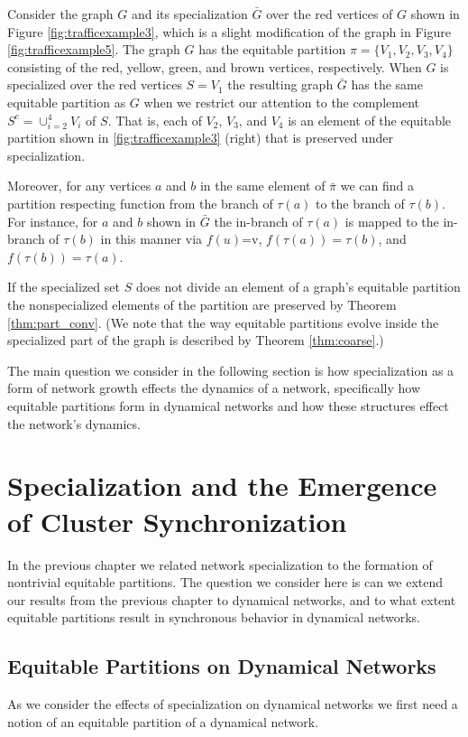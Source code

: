 \documentclass[12pt]{thesis}
\begin{document}
\begin{example}\label{ex:thm2}
Consider the graph $G$ and its specialization $\bar{G}$ over the red vertices of $G$ shown in Figure \ref{fig:trafficexample3}, which is a slight modification of the graph in Figure \ref{fig:trafficexample5}.
The graph $G$ has the equitable partition $\pi=\{V_1,V_2,V_3,V_4\}$ consisting of the red, yellow, green, and brown vertices, respectively.
When $G$ is specialized over the red vertices $S=V_1$ the resulting graph $\bar{G}$ has the same equitable partition as $G$ when we restrict our attention to the complement $S^c=\cup_{i=2}^4 V_i$ of $S$.
That is, each of $V_2$, $V_3$, and $V_4$ is an element of the equitable partition shown in \ref{fig:trafficexample3} (right) that is preserved under specialization.

Moreover, for any vertices $a$ and $b$ in the same element of $\bar{\pi}$ we can find a partition respecting function from the branch of $\tau(a)$ to the branch of $\tau(b)$.
For instance, for $a$ and $b$ shown in $\bar{G}$ the in-branch of $\tau(a)$ is mapped to the in-branch of $\tau(b)$ in this manner via $f(u)$=v, $f(\tau(a))=\tau(b)$, and $f(\tau(b))=\tau(a)$.
\end{example}

If the specialized set $S$ does not divide an element of a graph's equitable partition the nonspecialized elements of the partition are preserved by Theorem \ref{thm:part_conv}. (We note that the way equitable partitions evolve inside the specialized part of the graph is described by Theorem \ref{thm:coarse}.)  

The main question we consider in the following section is how specialization as a form of network growth effects the dynamics of a network, specifically how equitable partitions form in dynamical networks and how these structures effect the network's dynamics.

\chapter{Specialization and the Emergence of Cluster Synchronization}\label{chapt:sync}
In the previous chapter we related network specialization to the formation of nontrivial equitable partitions.
The question we consider here is can we extend our results from the previous chapter to dynamical networks, and to what extent equitable partitions result in synchronous behavior in dynamical networks.

\section{Equitable Partitions on Dynamical Networks}
As we consider the effects of specialization on dynamical networks we first need a notion of an equitable partition of a dynamical network.
\end{document}
